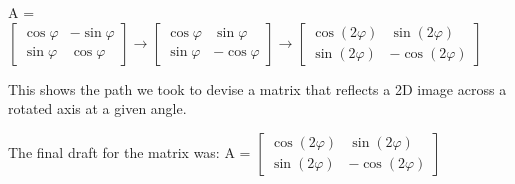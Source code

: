  \begin{center}
     A = $\left[\begin{array}{cc}
\cos\varphi & -\sin\varphi \\ \sin\varphi & \cos\varphi \end{array}\right] \rightarrow  \left[\begin{array}{cc}
\cos\varphi & \sin\varphi \\ \sin\varphi & -\cos\varphi \end{array}\right]\rightarrow
\left[\begin{array}{cc}
\cos(2\varphi) & \sin(2\varphi) \\ \sin(2\varphi) & -\cos(2\varphi) \end{array}\right]
$ \end{center} 

This shows the path we took to devise a matrix that reflects a 2D image across a rotated axis at a given angle. 



 \begin{center}
 The final draft for the matrix was:
     A = $\left[\begin{array}{cc}
\cos(2\varphi) & \sin(2\varphi) \\ \sin(2\varphi) & -\cos(2\varphi) \end{array}\right]
$ \end{center} 



